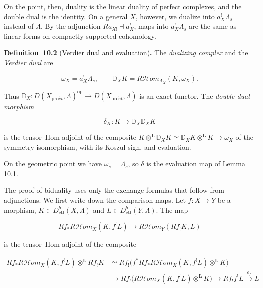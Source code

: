 \documentclass[11pt]{article}
\newenvironment{bpstatement}[2]{\par\addvspace{0.6\baselineskip}\noindent\textbf{#1}#2\textbf{.}\enspace\ignorespaces}
  {\par\addvspace{0.4\baselineskip}}
\providecommand{\cHom}{}\renewcommand{\cHom}{R\mathcal{H}\!om}
\begin{document}
\label{bp107}%
On the point, then, duality is the linear duality of perfect complexes, and the double dual is the identity. On a general \(X\), however, we dualize into \(a_X^!\Lambda_s\) instead of \(\Lambda\). By the adjunction \(Ra_{X!}\dashv a_X^!\), maps into \(a_X^!\Lambda_s\) are the same as linear forms on compactly supported cohomology.

\label{bp108}%
\begin{bpstatement}{Definition~10.2}{ (Verdier dual and evaluation)}
The \emph{dualizing complex} and the \emph{Verdier dual} are

\[
\omega_X=a_X^!\Lambda_s,\qquad
\mathbb D_XK=\cHom_{\Lambda_X}(K,\omega_X).
\]

Thus \(\mathbb D_X:D(X_{\mathrm{pro}\acute{e}t},\Lambda)^{\mathrm{op}}\to
D(X_{\mathrm{pro}\acute{e}t},\Lambda)\) is an exact functor. The \emph{double-dual morphism}

\[
\delta_K:K\longrightarrow\mathbb D_X\mathbb D_XK
\]

is the tensor–Hom adjoint of the composite \(K\otimes^{\mathbf L}\mathbb D_XK\simeq\mathbb D_XK\otimes^{\mathbf L}K
\to\omega_X\) of the symmetry isomorphism, with its Koszul sign, and evaluation.
\end{bpstatement}

\label{bp109}%
On the geometric point we have \(\omega_s=\Lambda_s\), so \(\delta\) is the evaluation map of Lemma \hyperref[bp105]{10.1}.

The proof of biduality uses only the exchange formulas that follow from adjunctions. We first write down the comparison maps. Let \(f:X\to Y\) be a morphism, \(K\in D^b_{\mathrm{ctf}}(X,\Lambda)\) and \(L\in D^b_{\mathrm{ctf}}(Y,\Lambda)\). The map

\[
Rf_*\cHom_X(K,f^!L)\longrightarrow\cHom_Y(Rf_!K,L)
\tag{10.1}
\]

is the tensor–Hom adjoint of the composite

\[
\begin{aligned}
Rf_*\cHom_X(K,f^!L)\otimes^{\mathbf L}Rf_!K
&\simeq Rf_!\bigl(f^*Rf_*\cHom_X(K,f^!L)\otimes^{\mathbf L}K\bigr)\\
&\longrightarrow Rf_!\bigl(\cHom_X(K,f^!L)\otimes^{\mathbf L}K\bigr)
\longrightarrow Rf_!f^!L\xrightarrow{\varepsilon_f}L
\end{aligned}
\]
\end{document}
